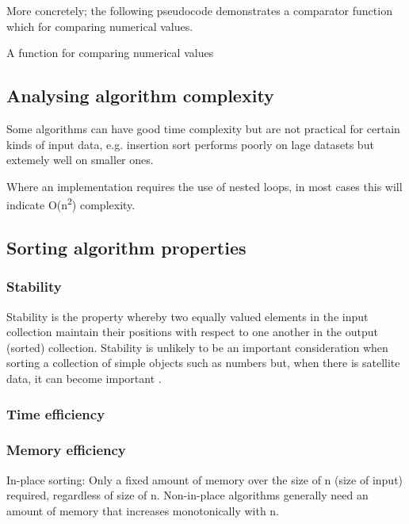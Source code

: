 \documentclass[12pt, a4paper]{article}
\begin{document}
More concretely; the following pseudocode demonstrates a comparator function which for comparing numerical values.

\begin{algorithm}
\caption{A function for comparing numerical values}\label{euclid}
\begin{algorithmic}[1]
 
\EndIf
{} 
\EndIf
{} 
\EndIf
\EndProcedure
\end{algorithmic}
\end{algorithm}

\subsection{Analysing algorithm complexity}

Some algorithms can have good time complexity but are not practical for certain kinds of input data, e.g. insertion sort performs poorly on lage datasets but extemely well on smaller ones.

Where an implementation requires the use of nested loops, in most cases this will indicate O(n\textsuperscript{2}) complexity.

\subsection{Sorting algorithm properties}

\subsubsection{Stability}

Stability is the property whereby two equally valued elements in the input collection maintain their positions with respect to one another in the output (sorted) collection. Stability is unlikely to be an important consideration when sorting a collection of simple objects such as numbers but, when there is satellite data, it can become important \autocite{cormen01}.

\subsubsection{Time efficiency}

\subsubsection{Memory efficiency}
In-place sorting: Only a fixed amount of memory over the size of n (size of input) required, regardless of size of n. Non-in-place algorithms generally need an amount of memory that increases monotonically with n.
\end{document}
